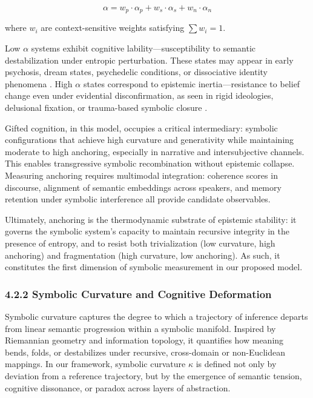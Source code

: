 \[
\alpha = w_p \cdot \alpha_p + w_s \cdot \alpha_s + w_n \cdot \alpha_n
\]

where $w_i$ are context-sensitive weights satisfying $\sum w_i = 1$.

Low $\alpha$ systems exhibit cognitive lability—susceptibility to semantic destabilization under entropic perturbation. These states may appear in early psychosis, dream states, psychedelic conditions, or dissociative identity phenomena \cite{carhart2014entropic, varela1996neurophenomenology}. High $\alpha$ states correspond to epistemic inertia—resistance to belief change even under evidential disconfirmation, as seen in rigid ideologies, delusional fixation, or trauma-based symbolic closure \cite{bateson1979mind}.

Gifted cognition, in this model, occupies a critical intermediary: symbolic configurations that achieve high curvature and generativity while maintaining moderate to high anchoring, especially in narrative and intersubjective channels. This enables transgressive symbolic recombination without epistemic collapse. Measuring anchoring requires multimodal integration: coherence scores in discourse, alignment of semantic embeddings across speakers, and memory retention under symbolic interference all provide candidate observables.

Ultimately, anchoring is the thermodynamic substrate of epistemic stability: it governs the symbolic system’s capacity to maintain recursive integrity in the presence of entropy, and to resist both trivialization (low curvature, high anchoring) and fragmentation (high curvature, low anchoring). As such, it constitutes the first dimension of symbolic measurement in our proposed model.

\subsubsection*{4.2.2 Symbolic Curvature and Cognitive Deformation}

Symbolic curvature captures the degree to which a trajectory of inference departs from linear semantic progression within a symbolic manifold. Inspired by Riemannian geometry and information topology, it quantifies how meaning bends, folds, or destabilizes under recursive, cross-domain or non-Euclidean mappings. In our framework, symbolic curvature $\kappa$ is defined not only by deviation from a reference trajectory, but by the emergence of semantic tension, cognitive dissonance, or paradox across layers of abstraction.


